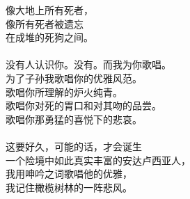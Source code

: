 \documentclass{article}
\begin{document}
\begin{center}
\begin{minipage}{0.5\linewidth}
\end{minipage}

\newpage

\begin{minipage}{0.5\linewidth}

\Large

像大地上所有死者， \\
像所有死者被遗忘 \\
在成堆的死狗之间。 \\
 \\
没有人认识你。没有。而我为你歌唱。 \\
为了子孙我歌唱你的优雅风范。 \\
歌唱你所理解的炉火纯青。 \\
歌唱你对死的胃口和对其吻的品尝。 \\
歌唱你那勇猛的喜悦下的悲哀。 \\
 \\
这要好久，可能的话，才会诞生 \\
一个险境中如此真实丰富的安达卢西亚人， \\
我用呻吟之词歌唱他的优雅， \\
我记住橄榄树林的一阵悲风。\end{minipage}

\end{center}
\end{document}
